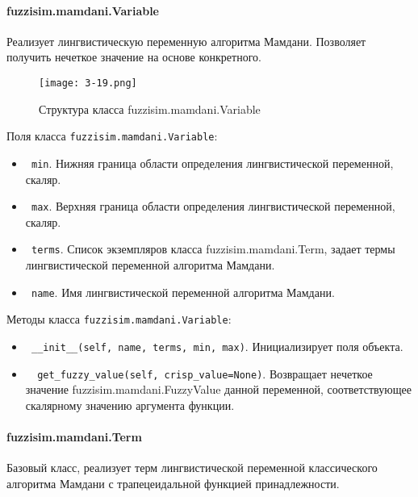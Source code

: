 \paragraph{fuzzisim.mamdani.Variable}
Реализует лингвистическую переменную алгоритма Мамдани. Позволяет получить нечеткое значение на основе конкретного.

\begin{figure}[ht]
	\centering
	\texttt{[image: 3-19.png]}
	\caption{ Структура класса fuzzisim.mamdani.Variable}
\end{figure}

Поля класса \lstinline!fuzzisim.mamdani.Variable!:
\begin{itemize}
	\item \lstinline! min!. Нижняя граница области определения лингвистической переменной, скаляр.
	\item \lstinline! max!. Верхняя граница области определения лингвистической переменной, скаляр.
	\item \lstinline! terms!.   Список экземпляров класса  fuzzisim.mamdani.Term, задает термы лингвистической переменной алгоритма Мамдани.
	\item \lstinline! name!. Имя лингвистической переменной алгоритма Мамдани.
\end{itemize}


Методы класса \lstinline!fuzzisim.mamdani.Variable!:
\begin{itemize}
	\item \lstinline! __init__(self, name, terms, min, max)!. Инициализирует поля объекта.
	\item \lstinline!  get_fuzzy_value(self, crisp_value=None)!. Возвращает нечеткое значение fuzzisim.mamdani.FuzzyValue данной переменной, соответствующее скалярному значению аргумента функции.
\end{itemize}





\paragraph{fuzzisim.mamdani.Term}

Базовый класс, реализует терм лингвистической переменной классического алгоритма Мамдани с трапецеидальной функцией принадлежности.


